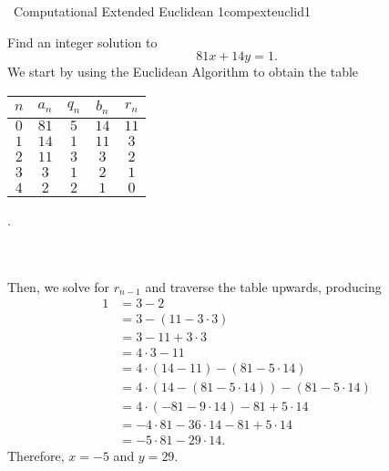     \begin{exercise}{\Difficulty\,\Difficulty\,\,Computational Extended Euclidean 1}{compexteuclid1}
    
        Find an integer solution to
        \begin{equation*}
            81x+14y=1.
        \end{equation*}
        We start by using the Euclidean Algorithm to obtain the table
        \begin{center}
            \begin{tabular}{c|c|c|c|c}
                \hline
                \(n\) & \(a_n\) & \(q_n\) & \(b_n\) & \(r_n\) \\
                \hline
                \(0\) & \(81\) & \(5\) & \(14\) & \(11\) \\
                \(1\) & \(14\) & \(1\) & \(11\) & \(3\) \\
                \(2\) & \(11\) & \(3\) & \(3\) & \(2\) \\
                \(3\) & \(3\) & \(1\) & \(2\) & \(1\) \\
                \(4\) & \(2\) & \(2\) & \(1\) & \(0\) \\
                \hline
            \end{tabular}.
        \end{center}
        \vphantom
        \\
        \\
        Then, we solve for \(r_{n-1}\) and traverse the table upwards, producing
        \begin{align*}
            1&=3-2 \\
            &=3-(11-3\cdot3) \\
            &=3-11+3\cdot3 \\
            &=4\cdot3-11 \\
            &=4\cdot(14-11)-(81-5\cdot14) \\
            &=4\cdot(14-(81-5\cdot14))-(81-5\cdot14) \\
            &=4\cdot(-81-9\cdot14)-81+5\cdot14 \\
            &=-4\cdot81-36\cdot14-81+5\cdot14 \\
            &=-5\cdot81-29\cdot14.
        \end{align*}
        Therefore, \(x=-5\) and \(y=29\).
    
    \end{exercise}
    \vphantom
    \\
    \\
